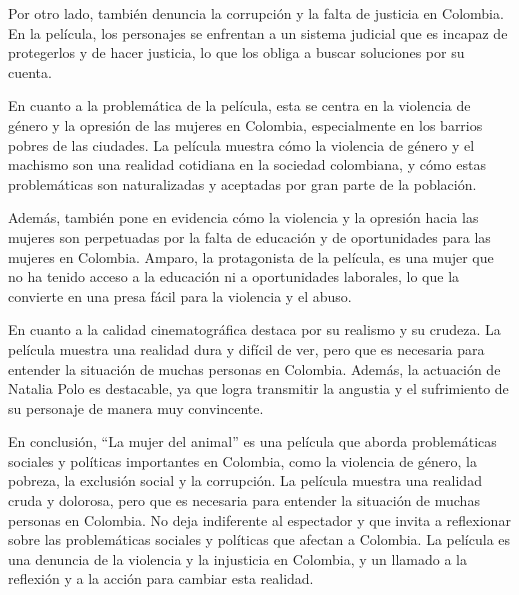 \documentclass[letterpaper, 12pt]{report}
\begin{document}
Por otro lado, también denuncia la corrupción y la falta de
justicia en Colombia. En la película, los personajes se
enfrentan a un sistema judicial que es incapaz de
protegerlos y de hacer justicia, lo que los obliga a buscar
soluciones por su cuenta.

En cuanto a la problemática de la película, esta se centra
en la violencia de género y la opresión de las mujeres en
Colombia, especialmente en los barrios pobres de las
ciudades. La película muestra cómo la violencia de género y
el machismo son una realidad cotidiana en la sociedad
colombiana, y cómo estas problemáticas son naturalizadas y
aceptadas por gran parte de la población.

Además, también pone en evidencia cómo la violencia y la
opresión hacia las mujeres son perpetuadas por la falta de
educación y de oportunidades para las mujeres en Colombia.
Amparo, la protagonista de la película, es una mujer que no
ha tenido acceso a la educación ni a oportunidades
laborales, lo que la convierte en una presa fácil para la
violencia y el abuso.

En cuanto a la calidad cinematográfica destaca por su
realismo y su crudeza. La película muestra una realidad
dura y difícil de ver, pero que es necesaria para entender
la situación de muchas personas en Colombia. Además, la
actuación de Natalia Polo es destacable, ya que logra
transmitir la angustia y el sufrimiento de su personaje de
manera muy convincente.

En conclusión, ``La mujer del animal'' es una película que
aborda problemáticas sociales y políticas importantes en
Colombia, como la violencia de género, la pobreza, la
exclusión social y la corrupción. La película muestra una
realidad cruda y dolorosa, pero que es necesaria para
entender la situación de muchas personas en Colombia. No
deja indiferente al espectador y que invita a reflexionar
sobre las problemáticas sociales y políticas que afectan a
Colombia. La película es una denuncia de la violencia y la
injusticia en Colombia, y un llamado a la reflexión y a la
acción para cambiar esta realidad.

\newpage

\printbibliography
% 
\end{document}
